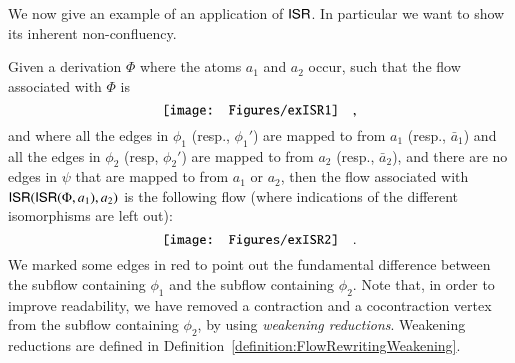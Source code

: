 
We now give an example of an application of $\mathsf{ISR}$. In particular we want to show its inherent non-confluency.

\begin{example}\label{example:IsolatedSubflowRemover}
Given a derivation $\Phi$ where the atoms $a_1$ and $a_2$ occur, such that the flow associated with $\Phi$ is
\[
\vcenter{\hbox{\texttt{[image: Figures/exISR1]}}}
\quad,
\]
and where all the edges in $\phi_1$ (resp., $\phi_1'$) are mapped to from $a_1$ (resp., $\bar a_1$) and all the edges in $\phi_2$ (resp, $\phi_2'$) are mapped to from $a_2$ (resp., $\bar a_2$), and there are no edges in $\psi$ that are mapped to from $a_1$ or $a_2$, then the flow associated with $\mathsf{ISR}(\mathsf{ISR}(\Phi,a_1),a_2)$ is the following flow (where indications of the different isomorphisms are left out):
\[
\vcenter{\hbox{\texttt{[image: Figures/exISR2]}}}
\quad.
\]
We marked some edges in red to point out the fundamental difference between the subflow containing $\phi_1$ and the subflow containing $\phi_2$. Note that, in order to improve readability, we have removed a contraction and a cocontraction vertex from the subflow containing $\phi_2$, by using \emph{weakening reductions}. Weakening reductions are defined in Definition~\vref{definition:FlowRewritingWeakening}.
\end{example}
